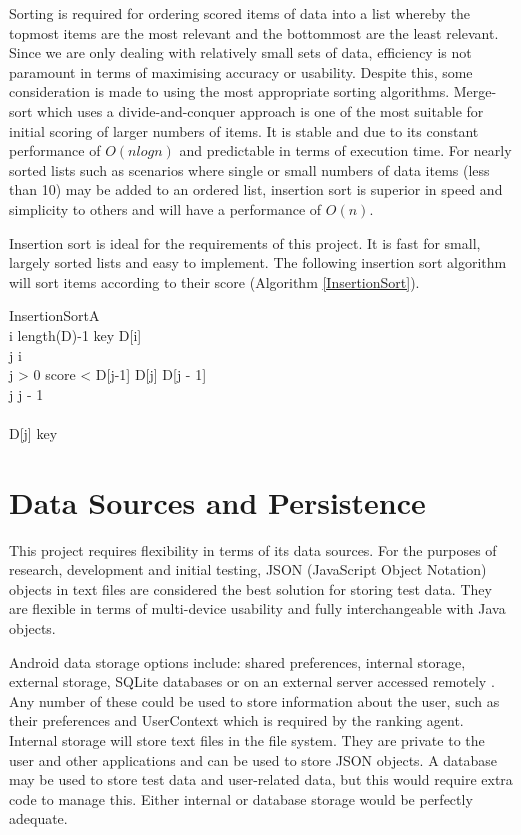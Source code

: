 Sorting is required for ordering scored items of data into a list whereby the topmost items are the most relevant and the bottommost are the least relevant. Since we are only dealing with relatively small sets of data, efficiency is not paramount in terms of maximising accuracy or usability. Despite this, some consideration is made to using the most appropriate sorting algorithms. 
Merge-sort which uses a divide-and-conquer approach is one of the most suitable for initial scoring of larger numbers of items. It is stable and due to its constant performance of $O(nlogn)$ and predictable in terms of execution time. 
For nearly sorted lists such as scenarios where single or small numbers of data items (less than 10) may be added to an ordered list, insertion sort is superior in speed and simplicity to others and will have a performance of $O(n)$.

Insertion sort is ideal for the requirements of this project. It is fast for small, largely sorted lists and easy to implement. The following insertion sort algorithm will sort items according to their score (Algorithm \ref{InsertionSort}).

\begin{pseudocode}{InsertionSort}{A}
	\label{InsertionSort}
	\\
	\FOR i \TO length(D)-1 \DO
	\BEGIN
		key \GETS D[i]\\
		j \GETS i\\
		\WHILE j > 0 \AND score < D[j-1] \DO
		\BEGIN
			D[j] \GETS D[j - 1]\\
			j \GETS j - 1\\
		\END \\
		D[j] \GETS key \\
	\END	
		
\end{pseudocode}

\section{Data Sources and Persistence}

This project requires flexibility in terms of its data sources. For the purposes of research, development and initial testing, JSON (JavaScript Object Notation) objects in text files are considered the best solution for storing test data. They are flexible in terms of multi-device usability and fully interchangeable with Java objects.

Android data storage options include: shared preferences, internal storage, external storage, SQLite databases or on an external server accessed remotely \cite{BeginningAndroidDataPersistence}. Any number of these could be used to store information about the user, such as their preferences and UserContext which is required by the ranking agent. Internal storage will store text files in the file system. They are private to the user and other applications and can be used to store JSON objects. A database may be used to store test data and user-related data, but this would require extra code to manage this. Either internal or database storage would be perfectly adequate.

